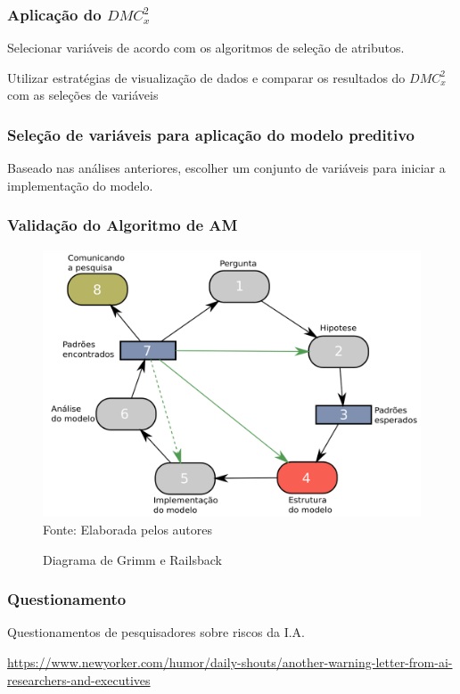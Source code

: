 \documentclass[11pt, aspectratio=169]{beamer}
\newcommand{\dmc}{\(DMC_x^2\) }
\begin{document}
\begin{frame}
  \frametitle{Aplicação do \dmc}

  Selecionar variáveis de acordo com os algoritmos de seleção de atributos.

  Utilizar estratégias de visualização de dados e comparar os resultados do \dmc com as seleções de variáveis


\end{frame}

\begin{frame}
  \frametitle{Seleção de variáveis para aplicação do modelo preditivo}

  Baseado nas análises anteriores, escolher um conjunto de variáveis para iniciar a implementação do modelo.


\end{frame}


\begin{frame}
  \frametitle{Validação do Algoritmo de AM}

  \begin{figure}[!htb]
    \centering
    \caption{Diagrama de Grimm e Railsback}
    \includegraphics[height=.6\paperheight]{../Figures/intro/Ciclo_Grimm.png}
    \\{\footnotesize Fonte: Elaborada pelos autores}
    \label{fig:fluxoGrimm}
  \end{figure}



\end{frame}

\begin{frame}
  \frametitle{Questionamento}
  \begin{center}


    \Huge{Questionamentos de pesquisadores sobre riscos da I.A.}

  \end{center}
  \leavevmode\hphantom{ }
  \begin{center}
    \small{\url{https://www.newyorker.com/humor/daily-shouts/another-warning-letter-from-ai-researchers-and-executives}}
  \end{center}

\end{frame}
\end{document}
